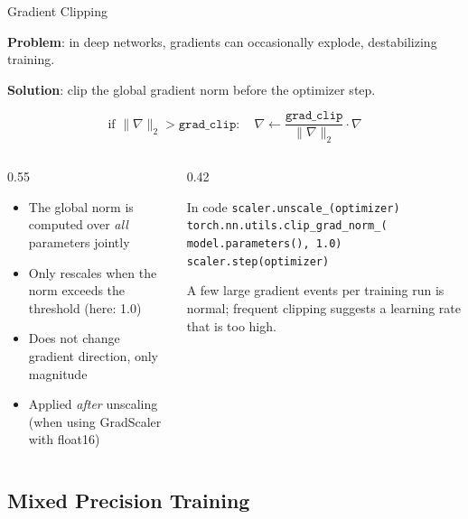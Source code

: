 \begin{frame}{Gradient Clipping}

  \textbf{Problem}: in deep networks, gradients can occasionally explode, destabilizing training.

  \vspace{0.5em}
  \textbf{Solution}: clip the global gradient norm before the optimizer step.

  \[
    \text{if } \|\nabla\|_2 > \texttt{grad\_clip}: \quad \nabla \leftarrow \frac{\texttt{grad\_clip}}{\|\nabla\|_2} \cdot \nabla
  \]

  \begin{columns}
    \begin{column}{0.55\textwidth}
      \begin{itemize}
        \item The global norm is computed over \emph{all} parameters jointly
        \item Only rescales when the norm exceeds the threshold (here: 1.0)
        \item Does not change gradient direction, only magnitude
        \item Applied \emph{after} unscaling (when using GradScaler with float16)
      \end{itemize}
    \end{column}
    \begin{column}{0.42\textwidth}
      \begin{block}{In code}
        \small
        \texttt{scaler.unscale\_(optimizer)} \\
        \texttt{torch.nn.utils.clip\_grad\_norm\_(} \\
        \texttt{\quad model.parameters(), 1.0)} \\
        \texttt{scaler.step(optimizer)}
      \end{block}
      \vspace{0.3em}
      A few large gradient events per training run is normal; frequent clipping suggests a learning rate that is too high.
    \end{column}
  \end{columns}
\end{frame}

\subsection{Mixed Precision Training}

